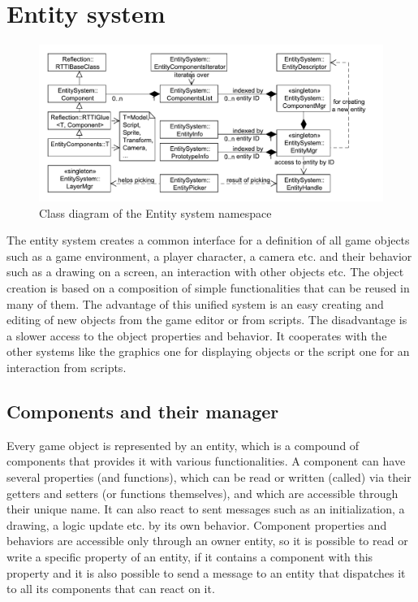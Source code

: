 \documentclass[a4paper, 12pt]{report}
\begin{document}
\chapter{Entity system}

\begin{figure}[htbp]
	\centering
		\includegraphics[width=1\textwidth]{EntitySystemClassDiagram.pdf}
	\caption{Class diagram of the Entity system namespace}
	\label{fig:entitysystem-diagram}
\end{figure}

The entity system creates a common interface for a definition of all game objects such as a game environment, a player character, a camera etc. and their behavior such as a drawing on a screen, an interaction with other objects etc. The object creation is based on a composition of simple functionalities that can be reused in many of them. The advantage of this unified system is an easy creating and editing of new objects from the game editor or from scripts. The disadvantage is a slower access to the object properties and behavior. It cooperates with the other systems like the graphics one for displaying objects or the script one for an interaction from scripts.

\section{Components and their manager}

Every game object is represented by an entity, which is a compound of components that provides it with various functionalities. A component can have several properties (and functions), which can be read or written (called) via their getters and setters (or functions themselves), and which are accessible through their unique name. It can also react to sent messages such as an initialization, a drawing, a logic update etc. by its own behavior. Component properties and behaviors are accessible only through an owner entity, so it is possible to read or write a specific property of an entity, if it contains a component with this property and it is also possible to send a message to an entity that dispatches it to all its components that can react on it.
\end{document}
